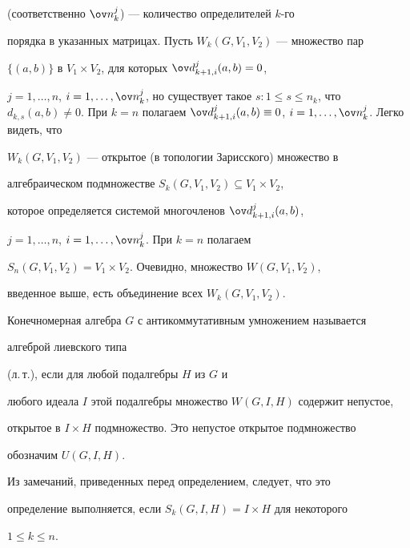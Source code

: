 (соответственно $\ov n{}^j_k$) --- количество определителей $k$-го 


порядка в указанных матрицах. Пусть $W_k(G,V_1,V_2)$ --- множество пар 


$\{(a,b)\}$ в $V_1\times V_2$, для которых $\ov d{}^j_{k+1,i}(a,b)=0$, 


$j=1,\dotsc,n$, $i=1,\dotsc,\ov n{}^j_k$, но существует такое $s:1\le 


s\le n_k$, что $d_{k,s}(a,b)\ne0$. При $k=n$ полагаем $\ov 


d{}^j_{k+1,i}(a,b)\equiv0$, $i=1,\dotsc,\ov n{}^j_k$. Легко видеть, что 


$W_k(G,V_1,V_2)$ --- открытое (в топологии Зарисского) множество в 


алгебраическом подмножестве $S_k(G,V_1,V_2)\subseteq V_1\times V_2$, 


которое определяется системой многочленов $\ov d{}^j_{k+1,i}(a,b)$, 


$j=1,\dotsc,n$, $i=1,\dotsc,\ov n{}^j_k$. При $k=n$ полагаем 


$S_n(G,V_1,V_2)=V_1\times V_2$. Очевидно, множество $W(G,V_1,V_2)$, 


введенное выше, есть объединение всех $W_k(G,V_1,V_2)$.  


 


 


\begin{defn} 


Конечномерная алгебра $G$ с антикоммутативным умножением называется {\it 


алгеброй лиевского типа} (л.\,т.), если для любой подалгебры $H$ из $G$ и 


любого идеала $I$ этой подалгебры множество $W(G,I,H)$ содержит непустое, 


открытое в $I\times H$ подмножество. Это непустое открытое подмножество 


обозначим $U(G,I,H)$.  


\end{defn} 


 


Из замечаний, приведенных перед определением, следует, что это 


определение выполняется, если $S_k(G,I,H)=I\times H$ для некоторого


$1\le k\le n$.  


 


